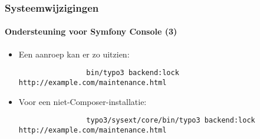 \begin{frame}[fragile]
	\frametitle{Systeemwijzigingen}
	\framesubtitle{Ondersteuning voor Symfony Console (3)}

	\lstset{basicstyle=\tiny\ttfamily}

	\begin{itemize}

		\item Een aanroep kan er zo uitzien:
			\begin{lstlisting}
				bin/typo3 backend:lock http://example.com/maintenance.html
			\end{lstlisting}

		\item Voor een niet-Composer-installatie:
			\begin{lstlisting}
				typo3/sysext/core/bin/typo3 backend:lock http://example.com/maintenance.html
			\end{lstlisting}

	\end{itemize}

\end{frame}

